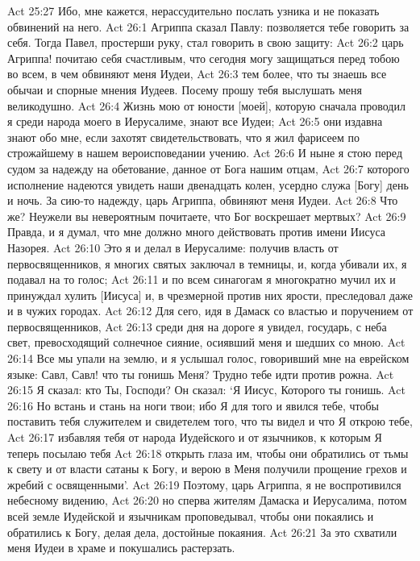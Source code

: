 Act 25:27  Ибо, мне кажется, нерассудительно послать узника и не показать обвинений на него.
Act 26:1  Агриппа сказал Павлу: позволяется тебе говорить за себя. Тогда Павел, простерши руку, стал говорить в свою защиту:
Act 26:2  царь Агриппа! почитаю себя счастливым, что сегодня могу защищаться перед тобою во всем, в чем обвиняют меня Иудеи,
Act 26:3  тем более, что ты знаешь все обычаи и спорные мнения Иудеев. Посему прошу тебя выслушать меня великодушно.
Act 26:4  Жизнь мою от юности [моей], которую сначала проводил я среди народа моего в Иерусалиме, знают все Иудеи;
Act 26:5  они издавна знают обо мне, если захотят свидетельствовать, что я жил фарисеем по строжайшему в нашем вероисповедании учению.
Act 26:6  И ныне я стою перед судом за надежду на обетование, данное от Бога нашим отцам,
Act 26:7  которого исполнение надеются увидеть наши двенадцать колен, усердно служа [Богу] день и ночь. За сию-то надежду, царь Агриппа, обвиняют меня Иудеи.
Act 26:8  Что же? Неужели вы невероятным почитаете, что Бог воскрешает мертвых?
Act 26:9  Правда, и я думал, что мне должно много действовать против имени Иисуса Назорея.
Act 26:10  Это я и делал в Иерусалиме: получив власть от первосвященников, я многих святых заключал в темницы, и, когда убивали их, я подавал на то голос;
Act 26:11  и по всем синагогам я многократно мучил их и принуждал хулить [Иисуса] и, в чрезмерной против них ярости, преследовал даже и в чужих городах.
Act 26:12  Для сего, идя в Дамаск со властью и поручением от первосвященников,
Act 26:13  среди дня на дороге я увидел, государь, с неба свет, превосходящий солнечное сияние, осиявший меня и шедших со мною.
Act 26:14  Все мы упали на землю, и я услышал голос, говоривший мне на еврейском языке: Савл, Савл! что ты гонишь Меня? Трудно тебе идти против рожна.
Act 26:15  Я сказал: кто Ты, Господи? Он сказал: `Я Иисус, Которого ты гонишь.
Act 26:16  Но встань и стань на ноги твои; ибо Я для того и явился тебе, чтобы поставить тебя служителем и свидетелем того, что ты видел и что Я открою тебе,
Act 26:17  избавляя тебя от народа Иудейского и от язычников, к которым Я теперь посылаю тебя
Act 26:18  открыть глаза им, чтобы они обратились от тьмы к свету и от власти сатаны к Богу, и верою в Меня получили прощение грехов и жребий с освященными'.
Act 26:19  Поэтому, царь Агриппа, я не воспротивился небесному видению,
Act 26:20  но сперва жителям Дамаска и Иерусалима, потом всей земле Иудейской и язычникам проповедывал, чтобы они покаялись и обратились к Богу, делая дела, достойные покаяния.
Act 26:21  За это схватили меня Иудеи в храме и покушались растерзать.
